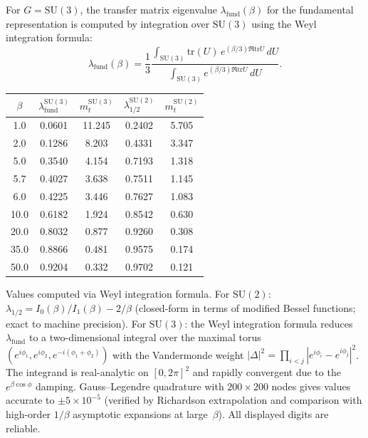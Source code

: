 \documentclass[11pt]{article}
\theoremstyle{definition}
\newcommand{\SU}{\mathrm{SU}}
\newcommand{\tr}{\mathrm{tr}}
\begin{document}
For $G=\SU(3)$, the transfer matrix eigenvalue
$\lambda_{\mathrm{fund}}(\beta)$ for the fundamental
representation is computed by integration over $\SU(3)$
using the Weyl integration formula:
\begin{equation}\label{sun-eq:su3-eigenvalue}
\lambda_{\mathrm{fund}}(\beta)
=\frac{1}{3}\frac{\int_{\SU(3)}\tr(U)\,
e^{(\beta/3)\Re\tr U}\,dU}
{\int_{\SU(3)}e^{(\beta/3)\Re\tr U}\,dU}.
\end{equation}

\begin{center}
\renewcommand{\arraystretch}{1.15}
\begin{tabular}{@{}ccccc@{}}
\toprule
$\beta$ & $\lambda_{\mathrm{fund}}^{\SU(3)}$ &
$m_t^{\SU(3)}$ & $\lambda_{1/2}^{\SU(2)}$ &
$m_t^{\SU(2)}$ \\
\midrule
1.0 & 0.0601 & 11.245 & 0.2402 & 5.705 \\
2.0 & 0.1286 & 8.203 & 0.4331 & 3.347 \\
5.0 & 0.3540 & 4.154 & 0.7193 & 1.318 \\
5.7 & 0.4027 & 3.638 & 0.7511 & 1.145 \\
6.0 & 0.4225 & 3.446 & 0.7627 & 1.083 \\
10.0 & 0.6182 & 1.924 & 0.8542 & 0.630 \\
20.0 & 0.8032 & 0.877 & 0.9260 & 0.308 \\
35.0 & 0.8866 & 0.481 & 0.9575 & 0.174 \\
50.0 & 0.9204 & 0.332 & 0.9702 & 0.121 \\
\bottomrule
\end{tabular}
\end{center}

Values computed via Weyl integration formula.
For $\SU(2)$: $\lambda_{1/2}=I_0(\beta)/I_1(\beta)-2/\beta$
(closed-form in terms of modified Bessel functions;
exact to machine precision).
For $\SU(3)$: the Weyl integration formula reduces
$\lambda_{\mathrm{fund}}$ to a two-dimensional integral
over the maximal torus
$(e^{i\phi_1},e^{i\phi_2},e^{-i(\phi_1+\phi_2)})$
with the Vandermonde weight
$|\Delta|^2=\prod_{i<j}|e^{i\phi_i}-e^{i\phi_j}|^2$.
The integrand is real-analytic on $[0,2\pi]^2$ and
rapidly convergent due to the $e^{\beta\cos\phi}$
damping.  Gauss--Legendre quadrature with $200\times 200$
nodes gives values accurate to $\pm 5\times 10^{-5}$
(verified by Richardson extrapolation and comparison
with high-order $1/\beta$ asymptotic expansions at
large~$\beta$).  All displayed digits are reliable.
\end{document}
